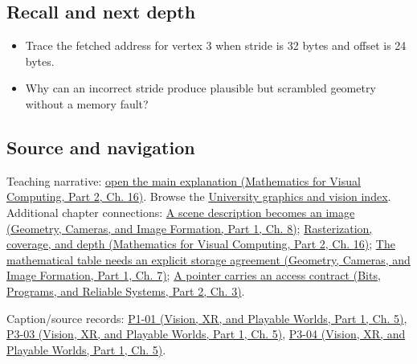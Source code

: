 \subsection{Recall and next depth}\label{appendix-749ba51a6c25-recall-and-next-depth}

\hypertarget{appendix-749ba51a6c25-recall-and-next-depth}{}

\begin{itemize}
\tightlist
\item
  Trace the fetched address for vertex 3 when stride is 32 bytes and offset is 24 bytes.
\item
  Why can an incorrect stride produce plausible but scrambled geometry without a memory fault?
\end{itemize}

\subsection{Source and navigation}\label{appendix-749ba51a6c25-source-and-navigation}

\hypertarget{appendix-749ba51a6c25-source-and-navigation}{}

Teaching narrative: \href{../02-Mathematics-for-Visual-Computing-P02/main.pdf\#nameddest=03-visual-computing-i-ch012-rasterization-coverage-and-depth}{open the main explanation (Mathematics for Visual Computing, Part 2, Ch. 16)}. Browse the \hyperref[appendix-a6d556a4ef50-university-graphics-vision-and-photography---independent-series]{University graphics and vision index}. Additional chapter connections: \href{../03-Geometry-Cameras-and-Image-Formation-P01/main.pdf\#nameddest=03-visual-computing-i-ch001-a-scene-description-becomes-an-image}{A scene description becomes an image (Geometry, Cameras, and Image Formation, Part 1, Ch. 8)}; \href{../02-Mathematics-for-Visual-Computing-P02/main.pdf\#nameddest=03-visual-computing-i-ch012-rasterization-coverage-and-depth}{Rasterization, coverage, and depth (Mathematics for Visual Computing, Part 2, Ch. 16)}; \href{../03-Geometry-Cameras-and-Image-Formation-P01/main.pdf\#nameddest=02-foundations-ii-ch038-the-mathematical-table-needs-an-explicit-storage-agreement}{The mathematical table needs an explicit storage agreement (Geometry, Cameras, and Image Formation, Part 1, Ch. 7)}; \href{../01-Bits-Programs-and-Reliable-Systems-P02/main.pdf\#nameddest=01-foundations-i-ch003-a-pointer-carries-an-access-contract}{A pointer carries an access contract (Bits, Programs, and Reliable Systems, Part 2, Ch. 3)}.

Caption/source records: \href{../07-Vision-XR-and-Playable-Worlds-P01/main.pdf\#nameddest=04-visual-computing-ii-ch036-p1-01---module-1.1-course-intro-administrivia-part-1-graphics-visual-computing-2026}{P1-01 (Vision, XR, and Playable Worlds, Part 1, Ch. 5)}, \href{../07-Vision-XR-and-Playable-Worlds-P01/main.pdf\#nameddest=04-visual-computing-ii-ch036-p3-03---moving-objects-in-space}{P3-03 (Vision, XR, and Playable Worlds, Part 1, Ch. 5)}, \href{../07-Vision-XR-and-Playable-Worlds-P01/main.pdf\#nameddest=04-visual-computing-ii-ch036-p3-04---rotations-about-an-arbitrary-axis}{P3-04 (Vision, XR, and Playable Worlds, Part 1, Ch. 5)}.
